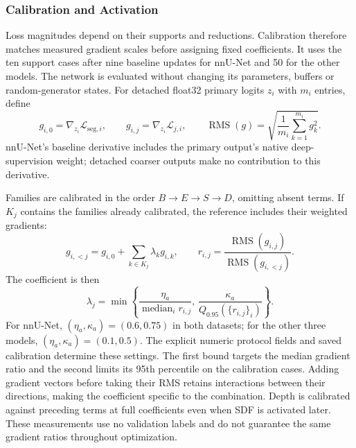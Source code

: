 \documentclass[12pt,a4paper]{article}
\begin{document}
\subsubsection{Calibration and Activation}
\label{sec:calibration-methods}

Loss magnitudes depend on their supports and reductions. Calibration
therefore matches measured gradient scales before assigning fixed
coefficients. It uses the ten support cases after nine
baseline updates for nnU-Net and 50 for the other models. The network
is evaluated without changing its parameters, buffers or random-generator
states. For detached float32 primary logits $z_i$ with $m_i$ entries,
define
\begin{equation}
g_{i,0}=\nabla_{z_i}\mathcal{L}_{\mathrm{seg},i},
\qquad
g_{i,j}=\nabla_{z_i}\mathcal{L}_{j,i},
\qquad
\operatorname{RMS}(g)=
\sqrt{\frac{1}{m_i}\sum_{k=1}^{m_i}g_k^2}.
\label{eq:calibration-logit-gradients}
\end{equation}
nnU-Net's baseline derivative includes the primary output's native
deep-supervision weight; detached coarser outputs make no contribution
to this derivative.

Families are calibrated in the order $B\to E\to S\to D$, omitting
absent terms. If $K_j$ contains the families already calibrated, the
reference includes their weighted gradients:
\begin{equation}
g_{i,<j}=g_{i,0}+\sum_{k\in K_j}\lambda_k g_{i,k},
\qquad
r_{i,j}=\frac{\operatorname{RMS}(g_{i,j})}
                  {\operatorname{RMS}(g_{i,<j})}.
\label{eq:sequential-calibration-ratio}
\end{equation}
The coefficient is then
\begin{equation}
\lambda_j=
\min\left\{
\frac{\eta_a}{\operatorname{median}_i r_{i,j}},\,
\frac{\kappa_a}{Q_{0.95}(\{r_{i,j}\}_i)}
\right\}.
\label{eq:constraint-calibrated-coefficient}
\end{equation}
For nnU-Net, $(\eta_a,\kappa_a)=(0.6,0.75)$ in both datasets;
for the other three models, $(\eta_a,\kappa_a)=(0.1,0.5)$. The explicit
numeric protocol fields and saved calibration determine these settings.
The first bound targets the median gradient ratio and the second
limits its 95th percentile on the calibration cases. Adding gradient vectors
before taking their RMS retains interactions between their directions,
making the coefficient specific to the combination. Depth is calibrated
against preceding terms at full coefficients even when SDF is activated
later. These measurements use no validation labels and do not guarantee
the same gradient ratios throughout optimization.
\end{document}
